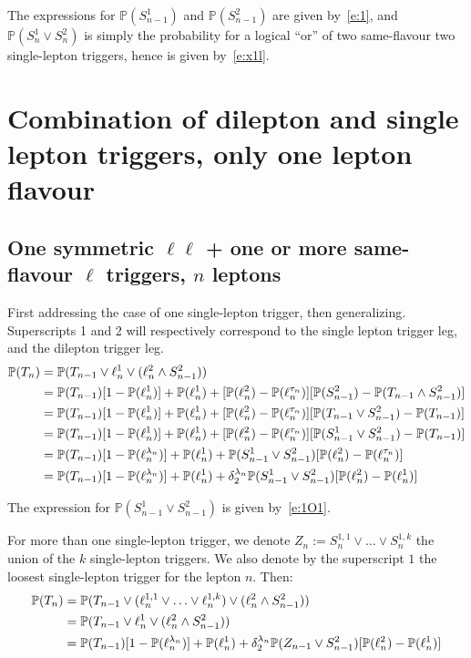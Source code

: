 \documentclass{article}
\newcommand{\pro}{\ensuremath{\mathbb{P}}}
\begin{document}
The expressions for $\pro(S_{n-1}^1)$ and $\pro(S_{n-1}^2)$ are given by~\ref{e:1}, 
and $\pro(S_{n}^1\vee S_{n}^2)$ is simply the probability 
for a logical ``or'' of two same-flavour two single-lepton triggers, hence is given by~\ref{e:x1l}. 

\section{Combination of dilepton and single lepton triggers, only one lepton flavour}

\subsection{One symmetric $\ell\ell$ + one or more same-flavour $\ell$ triggers, $n$ leptons}

First addressing the case of one single-lepton trigger, then generalizing. 
Superscripts 1 and 2 will respectively correspond to the single lepton trigger leg, and the dilepton trigger leg. 
\begin{align}
\pro(T_n) &= \pro(T_{n-1} \vee \ell_n^1 \vee (\ell_n^2 \wedge S_{n-1}^2))\notag\\
&= \pro(T_{n-1})[1-\pro(\ell_n^1)] + \pro(\ell_n^1)
+ [\pro(\ell_n^2)-\pro(\ell_n^{\tau_n})][\pro(S_{n-1}^2) - \pro(T_{n-1}\wedge S_{n-1}^2)] \notag\\
&= \pro(T_{n-1})[1-\pro(\ell_n^1)] + \pro(\ell_n^1)
+ [\pro(\ell_n^2)-\pro(\ell_n^{\tau_n})][\pro(T_{n-1}\vee S_{n-1}^2) - \pro(T_{n-1})]\notag\\
&= \pro(T_{n-1})[1-\pro(\ell_n^1)] + \pro(\ell_n^1)
+ [\pro(\ell_n^2)-\pro(\ell_n^{\tau_n})][\pro(S_{n-1}^1\vee S_{n-1}^2) - \pro(T_{n-1})]\notag\\
&= \pro(T_{n-1})[1-\pro(\ell_n^{\lambda_n})] + \pro(\ell_n^1)
+ \pro(S_{n-1}^1\vee S_{n-1}^2)[\pro(\ell_n^2)-\pro(\ell_n^{\tau_n})]\notag\\
&= \pro(T_{n-1})[1-\pro(\ell_n^{\lambda_n})] + \pro(\ell_n^1)
+ \delta_2^{\lambda_n}\pro(S_{n-1}^1\vee S_{n-1}^2)[\pro(\ell_n^2)-\pro(\ell_n^1)]\notag
\end{align}

The expression for $\pro(S_{n-1}^1\vee S_{n-1}^2)$ is given by~\ref{e:1O1}. 

For more than one single-lepton trigger, we denote $Z_n:=S_n^{1,1}\vee\ldots\vee S_n^{1,k}$ the union of the 
$k$ single-lepton triggers. We also denote by the superscript $1$ the loosest single-lepton trigger for the lepton $n$.  
Then: 
\begin{align}
\pro(T_n) 
&= \pro(T_{n-1} \vee (\ell_n^{1,1}\vee\ldots\vee\ell_n^{1,k}) \vee (\ell_n^2 \wedge S_{n-1}^2))\notag\\
&= \pro(T_{n-1} \vee \ell_n^{1} \vee (\ell_n^2 \wedge S_{n-1}^2))\notag\\
&= \pro(T_{n-1})[1-\pro(\ell_n^{\lambda_n})] + \pro(\ell_n^{1})
+ \delta_2^{\lambda_n}
\pro(Z_{n-1}\vee S_{n-1}^2)[\pro(\ell_n^2)-\pro(\ell_n^{1})]
\label{e:2sO1}
\end{align}
\end{document}

